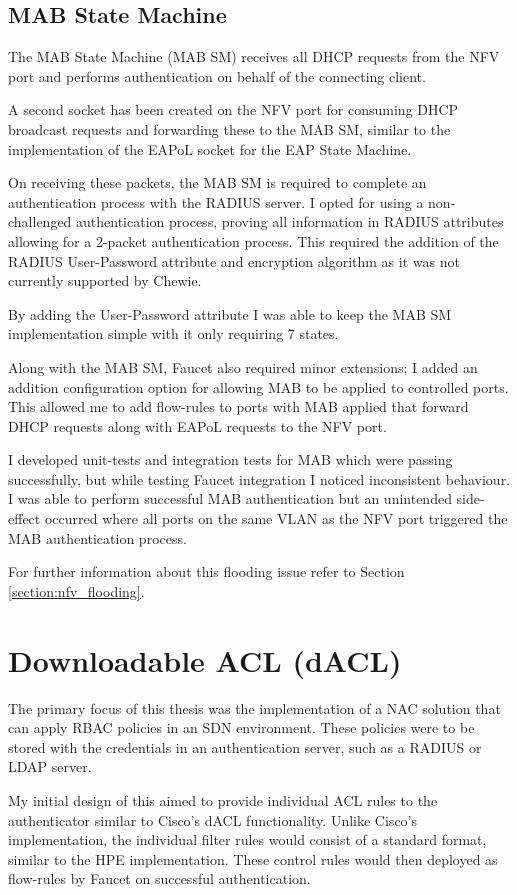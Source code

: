 \subsection{MAB State Machine}
The MAB State Machine (MAB SM) receives all DHCP requests from the NFV port and performs authentication on behalf of the connecting client.

A second socket has been created on the NFV port for consuming DHCP broadcast requests and forwarding these to the MAB SM, similar to the implementation of the EAPoL socket for the EAP State Machine.

On receiving these packets, the MAB SM is required to complete an authentication process with the RADIUS server. I opted for using a non-challenged authentication process, proving all information in RADIUS attributes allowing for a 2-packet authentication process. This required the addition of the RADIUS User-Password attribute and encryption algorithm\cite{radius_password_attribute} as it was not currently supported by Chewie.

By adding the User-Password attribute I was able to keep the MAB SM implementation simple with it only requiring 7 states.

Along with the MAB SM, Faucet also required minor extensions; I added an addition configuration option for allowing MAB to be applied to controlled ports. This allowed me to add flow-rules to ports with MAB applied that forward DHCP requests along with EAPoL requests to the NFV port.

I developed unit-tests and integration tests for MAB which were passing successfully, but while testing Faucet integration I noticed inconsistent behaviour. I was able to perform successful MAB authentication but an unintended side-effect occurred where all ports on the same VLAN as the NFV port triggered the MAB authentication process.

For further information about this flooding issue refer to Section \ref{section:nfv_flooding}.

\section{Downloadable ACL (dACL)}
The primary focus of this thesis was the implementation of a NAC solution that can apply RBAC policies in an SDN environment. These policies were to be stored with the credentials in an authentication server, such as a RADIUS or LDAP server.

My initial design of this aimed to provide individual ACL rules to the authenticator similar to Cisco's dACL functionality\cite{cisco_dacls}. Unlike Cisco's implementation, the individual filter rules would consist of a standard format, similar to the HPE implementation\cite{hpe_filter_rule}. These control rules would then deployed as flow-rules by Faucet on successful authentication.

